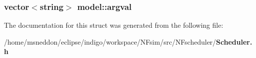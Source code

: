\subsubsection{\setlength{\rightskip}{0pt plus 5cm}vector$<$string$>$ {\bf model::argval}}\label{structmodel_5c62b322d04127df8d6b29e0aa3155e0}




The documentation for this struct was generated from the following file:\begin{CompactItemize}
\item 
/home/msneddon/eclipse/indigo/workspace/NFsim/src/NFscheduler/{\bf Scheduler.h}\end{CompactItemize}
